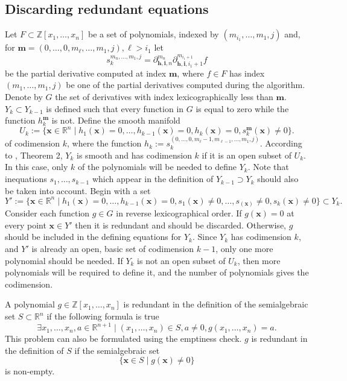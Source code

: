\documentclass[
]{book}
\theoremstyle{definition}
\theoremstyle{definition}
\theoremstyle{definition}
\theoremstyle{definition}
\theoremstyle{remark}
\begin{document}
\hypertarget{discarding-redundant-equations}{%
\subsection{Discarding redundant equations}\label{discarding-redundant-equations}}

Let \(F \subset \mathbb{Z}[x_1,\ldots,x_n]\) be a set of polynomials, indexed by \((m_{i_1},\ldots,m_1,j)\) and, for \(\mathbf{m} = (0,\ldots,0,m_\ell,\ldots,m_1,j),\ell > i_1\) let
\[
s^{m_n,\ldots,m_1,j}_k = \partial_{\mathbf{h}, \mathbf{i}, n}^{m_n} \partial_{\mathbf{h}, \mathbf{i}, i_1 + 1}^{m_{i_1 + 1}} f
\]
be the partial derivative computed at index \(\mathbf{m}\), where \(f \in F\) has index \((m_1,\ldots,m_1,j)\) be one of the partial derivatives computed during the algorithm.
Denote by \(G\) the set of derivatives with index lexicographically less than \(\mathbf{m}\). \(Y_k \subset Y_{k-1}\) is defined such that every function in \(G\) is equal to zero while the function \(h^{\mathbf{m}}_k\) is not.
Define the smooth manifold
\[
U_k := \{ \mathbf{x} \in \mathbb{R}^n \mid h_1(\mathbf{x}) = 0, \ldots, h_{k-1}(\mathbf{x}) = 0, h_k(\mathbf{x}) = 0, s^{\mathbf{m}}_k(\mathbf{x}) \ne 0 \}.
\]
of codimension \(k\), where the function \(h_k := s^{(0,\ldots,0,m_\ell - 1,m_{\ell - 1},\ldots,m_1,j)}_k\). According to \citet{gv1995}, Theorem 2, \(Y_k\) is smooth and has codimension \(k\) if it is an open subset of \(U_k\). In this case, only \(k\) of the polynomials will be needed to define \(Y_k\). Note that inequations \(s_1,\ldots,s_{k-1}\) which appear in the definition of \(Y_{k-1} \supset Y_k\) should also be taken into account.
Begin with a set
\[
Y' := \{ \mathbf{x} \in \mathbb{R}^n \mid h_1(\mathbf{x}) = 0, \ldots, h_{k-1}(\mathbf{x}) = 0, s_1(\mathbf{x}) \ne 0, \ldots, s_(\mathbf{x}) \ne 0, s_k(\mathbf{x}) \ne 0 \} \subset Y_k.
\]
Consider each function \(g \in G\) in reverse lexicographical order. If \(g(\mathbf{x}) = 0\) at every point \(\mathbf{x} \in Y'\) then it is redundant and should be discarded. Otherwise, \(g\) should be included in the defining equations for \(Y_k\). Since \(Y_k\) has codimension \(k\), and \(Y'\) is already an open, basic set of codimension \(k-1\), only one more polynomial should be needed.
If \(Y_k\) is not an open subset of \(U_k\), then more polynomials will be required to define it, and the number of polynomials gives the codimension.

A polynomial \(g \in \mathbb{Z}[x_1,\ldots,x_n]\) is redundant in the definition of the semialgebraic set \(S \subset \mathbb{R}^n\) if the following formula is true
\[
\exists x_1,\ldots,x_n,a \in \mathbb{R}^{n+1} \mid (x_1,\ldots,x_n) \in S, a \ne 0, g(x_1,\ldots,x_n) = a.
\]
This problem can also be formulated using the emptiness check. \(g\) is redundant in the definition of \(S\) if the semialgebraic set
\[
\{ \mathbf{x} \in S \mid g(\mathbf{x}) \ne 0 \}
\]
is non-empty.
\end{document}
